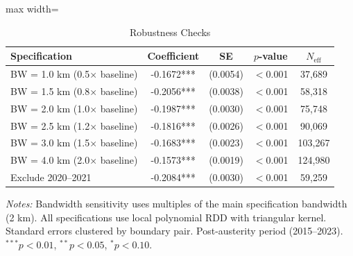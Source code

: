 \begin{table}[htbp]
\centering
\caption{Robustness Checks}
\label{tab:robustness}
\begin{adjustbox}{max width=\textwidth}
\begin{tabular}{lcccc}
\toprule
Specification & Coefficient & SE & $p$-value & $N_{\text{eff}}$ \\
\midrule
BW = 1.0 km (0.5$\times$ baseline) & -0.1672*** & (0.0054) & $<$0.001 & 37,689 \\
BW = 1.5 km (0.8$\times$ baseline) & -0.2056*** & (0.0038) & $<$0.001 & 58,318 \\
BW = 2.0 km (1.0$\times$ baseline) & -0.1987*** & (0.0030) & $<$0.001 & 75,748 \\
BW = 2.5 km (1.2$\times$ baseline) & -0.1816*** & (0.0026) & $<$0.001 & 90,069 \\
BW = 3.0 km (1.5$\times$ baseline) & -0.1683*** & (0.0023) & $<$0.001 & 103,267 \\
BW = 4.0 km (2.0$\times$ baseline) & -0.1573*** & (0.0019) & $<$0.001 & 124,980 \\
Exclude 2020--2021 & -0.2084*** & (0.0030) & $<$0.001 & 59,259 \\
\bottomrule
\end{tabular}
\end{adjustbox}
\parbox{\textwidth}{\footnotesize \textit{Notes:} Bandwidth sensitivity uses multiples of the main specification bandwidth (2 km). All specifications use local polynomial RDD with triangular kernel. Standard errors clustered by boundary pair. Post-austerity period (2015--2023). $^{***}p<0.01$, $^{**}p<0.05$, $^{*}p<0.10$.}
\end{table}

